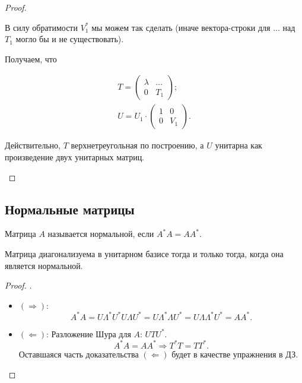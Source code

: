 \begin{proof}
\begin{induct}
        В силу обратимости $V_1^*$ мы можем так сделать (иначе вектора-строки
        для $\dots$ над $T_1$ могло бы и не существовать).

        Получаем, что

        \[
            \begin{array}{c}
                T = \begin{pmatrix}
                    \lambda & \dots \\
                    0 & T_1
                \end{pmatrix}; \\
                U = U_1 \cdot \begin{pmatrix}
                    1 & 0 \\
                    0 & V_1
                \end{pmatrix}.
            \end{array}
        \]

        Действительно, $T$ верхнетреугольная по построению, а $U$ унитарна как
        произведение двух унитарных матриц.
    \end{induct}
\end{proof}

\subsection{Нормальные матрицы}

\begin{definition}
    Матрица $A$ называется нормальной, если $A^* A = A A^*$.
\end{definition}

\begin{point}
    Матрица диагонализуема в унитарном базисе тогда и только тогда, когда она
    является нормальной.
\end{point}

\begin{proof}.

    \begin{itemize}
        \item $(\Rightarrow)$:
            \[
                A^* A = U \Lambda^* U^* U \Lambda U^* = U \Lambda^* \Lambda U^*
                = U \Lambda \Lambda^* U^* = A A^*.
            \]
        \item $(\Leftarrow)$: Разложение Шура для $A$: $U T U^*$.
            \[
                A^* A = A A^* \Rightarrow T^* T = T T^*.
            \]
            Оставшаяся часть доказательства $(\Leftarrow)$ будет в качестве
            упражнения в ДЗ.
    \end{itemize}
\end{proof}
